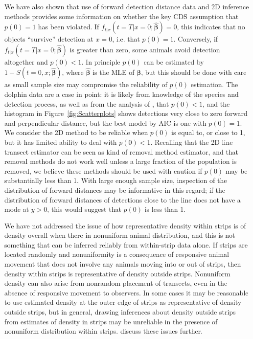 \documentclass[useAMS,usenatbib,referee]{biom}
\begin{document}
We have also shown that use of forward detection distance data and 2D inference methods provides some information on whether the key CDS assumption that $p(0)=1$ has been violated. If $f_{t|x}(t=T|x=0;\hat{\boldsymbol{\beta}})=0$, this indicates that no objects ``survive'' detection at $x=0$, i.e. that $p(0)=1$. %
Conversely, if $f_{t|x}(t=T|x=0;\hat{\boldsymbol{\beta}})$ is greater than zero, some animals avoid detection altogether and $p(0)<1$. In principle $p(0)$ can be estimated by $1-S(t=0,x;\hat{\boldsymbol{\beta}})$, where $\hat{\boldsymbol{\beta}}$ is the MLE of $\boldsymbol{\beta}$, but this should be done with care as small sample size may compromise the reliability of $p(0)$ estimation. The dolphin data are a case in point: it is likely from knowledge of the species and detection process, as well as from the analysis of \cite{Canadas+al:04}, that $p(0)<1$, and the histogram in Figure~\ref{fig:Scatterplots} %
shows detections very close to zero forward and perpendicular distance, but the best model by AIC is one with $p(0)=1$. We consider the 2D method to be reliable when $p(0)$ is equal to, or close to 1, but it has limited ability to deal with $p(0)<1$. Recalling that the 2D line transect estimator can be seen as kind of removal method estimator, and that removal methods do not work well unless a large fraction of the population is removed, we believe these methods should be used with caution if $p(0)$ may be substantially less than 1.  With large enough sample size, inspection of the distribution of forward distances may be informative in this regard; if the distribution of forward distances of detections close to the line does not have a mode at $y>0$, this would suggest that $p(0)$ is less than 1.

We have not addressed the issue of how representative density within strips is of density overall when there in nonuniform animal distribution, and this is not something that can be inferred reliably from within-strip data alone. If strips are located randomly and nonuniformity is a consequence of responsive animal movement that does not involve any animals moving into or out of strips, then density within strips is representative of density outside strips. Nonuniform density can also arise from nonrandom placement of transects, even in the absence of responsive movement to observers. %
In some cases it may be reasonable to use estimated density at the outer edge of strips as representative of density outside strips, but in general, drawing inferences about density outside strips from estimates of density in strips may be unreliable in the presence of nonuniform distribution within strips. \cite{Marques+al:10a} discuss these issues further.
%
%
\end{document}
